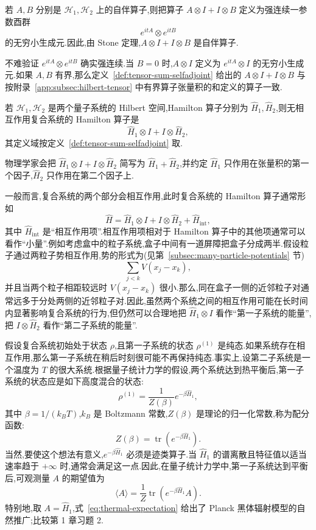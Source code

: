 \begin{definition}[两个自伴算子的张量和]\label{def:tensor-sum-selfadjoint}
若 $A,B$ 分别是 $\mathcal H_1,\mathcal H_2$ 上的自伴算子,则把算子 $A\otimes I+I\otimes B$ 定义为强连续一参数酉群
\[
 e^{itA}\otimes e^{itB}
\]
的无穷小生成元.因此,由 Stone 定理,$A\otimes I+I\otimes B$ 是自伴算子.
\end{definition}

不难验证 $e^{itA}\otimes e^{itB}$ 确实强连续.当 $B=0$ 时,$A\otimes I$ 定义为 $e^{itA}\otimes I$ 的无穷小生成元.如果 $A,B$ 有界,那么定义~\ref{def:tensor-sum-selfadjoint} 给出的 $A\otimes I+I\otimes B$ 与按附录~\ref{app:subsec:hilbert-tensor} 中有界算子张量积的和定义的算子一致.

\begin{axiom}\label{ax:noninteracting-composite-hamiltonian}
若 $\mathcal H_1,\mathcal H_2$ 是两个量子系统的 Hilbert 空间,Hamilton 算子分别为 $\widehat H_1,\widehat H_2$,则无相互作用复合系统的 Hamilton 算子是
\[
 \widehat H_1\otimes I+I\otimes\widehat H_2,
\]
其定义域按定义~\ref{def:tensor-sum-selfadjoint} 取.
\end{axiom}

物理学家会把 $\widehat H_1\otimes I+I\otimes\widehat H_2$ 简写为 $\widehat H_1+\widehat H_2$,并约定 $\widehat H_1$ 只作用在张量积的第一个因子,$\widehat H_2$ 只作用在第二个因子上.

一般而言,复合系统的两个部分会相互作用,此时复合系统的 Hamilton 算子通常形如
\[
 \widehat H=\widehat H_1\otimes I+I\otimes\widehat H_2+\widehat H_{\mathrm{int}},
\]
其中 $\widehat H_{\mathrm{int}}$ 是“相互作用项”.相互作用项相对于 Hamilton 算子中的其他项通常可以看作“小量”.例如考虑盒中的粒子系统,盒子中间有一道屏障把盒子分成两半.假设粒子通过两粒子势相互作用,势的形式为(见第~\ref{subsec:many-particle-potentials} 节)
\[
 \sum_{j<k}V(x_j-x_k),
\]
并且当两个粒子相距较远时 $V(x_j-x_k)$ 很小.那么,同在盒子一侧的近邻粒子对通常远多于分处两侧的近邻粒子对.因此,虽然两个系统之间的相互作用可能在长时间内显著影响复合系统的行为,但仍然可以合理地把 $\widehat H_1\otimes I$ 看作“第一子系统的能量”,把 $I\otimes\widehat H_2$ 看作“第二子系统的能量”.

假设复合系统初始处于状态 $\rho$,且第一子系统的状态 $\rho^{(1)}$ 是纯态.如果系统存在相互作用,那么第一子系统在稍后时刻很可能不再保持纯态.事实上,设第二子系统是一个温度为 $T$ 的很大系统.根据量子统计力学的假设,两个系统达到热平衡后,第一子系统的状态应是如下高度混合的状态:
\[
 \rho^{(1)}=\frac1{Z(\beta)}e^{-\beta\widehat H_1},\label{eq:gibbs-density-matrix}
\]
其中 $\beta=1/(k_BT)$,$k_B$ 是 Boltzmann 常数,$Z(\beta)$ 是理论的归一化常数,称为配分函数:
\[
 Z(\beta)=\operatorname{tr}(e^{-\beta\widehat H_1}).
\]
当然,要使这个想法有意义,$e^{-\beta\widehat H_1}$ 必须是迹类算子.当 $\widehat H_1$ 的谱离散且特征值以适当速率趋于 $+\infty$ 时,通常会满足这一点.因此,在量子统计力学中,第一子系统达到平衡后,可观测量 $A$ 的期望值为
\[
 \langle A\rangle
 =\frac1{Z}\operatorname{tr}(e^{-\beta\widehat H_1}A).\label{eq:thermal-expectation}
\]
特别地,取 $A=\widehat H_1$,式~\eqref{eq:thermal-expectation} 给出了 Planck 黑体辐射模型的自然推广;比较第 1 章习题 2.


